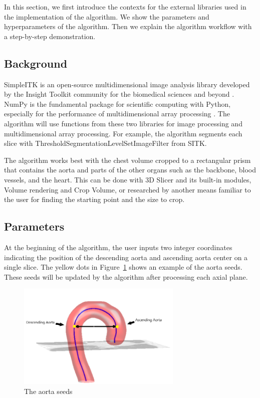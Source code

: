 In this section, we first introduce the contexts for the external libraries used in the implementation of the algorithm. We show the parameters and hyperparameters of the algorithm. Then we explain the algorithm workflow with a step-by-step demonstration.

\subsection{Background} \label{algo_bg}

SimpleITK is an open-source multidimensional image analysis library developed by the Insight Toolkit community for the biomedical sciences and beyond \cite{JSSv086i08}\cite{10.3389/fninf.2013.00045}. NumPy is the fundamental package for scientific computing with Python, especially for the performance of multidimensional array processing \cite{harris2020array}. The algorithm will use functions from these two libraries for image processing and multidimensional array processing. For example, the algorithm segments each slice with ThresholdSegmentationLevelSetImageFilter from SITK.

The algorithm works best with the chest volume cropped to a rectangular prism that contains the aorta and parts of the other organs such as the backbone, blood vessels, and the heart. This can be done with 3D Slicer and its built-in modules, Volume rendering and Crop Volume, or researched by another means familiar to the user for finding the starting point and the size to crop.

\subsection{Parameters}

At the beginning of the algorithm, the user inputs two integer coordinates indicating the position of the descending aorta and ascending aorta center on a single slice. The yellow dots in Figure~\ref{fig_aorta_seed} shows an example of the aorta seeds. These seeds will be updated by the algorithm after processing each axial plane.

\begin{figure}[ht]
    \centering
    \includegraphics[width=0.7\textwidth]{figures/Sample/Aorta_seeds.png}
    \caption[The Aorta Seeds]{The aorta seeds \citep{6346433}}
    \label{fig_aorta_seed}
\end{figure}


